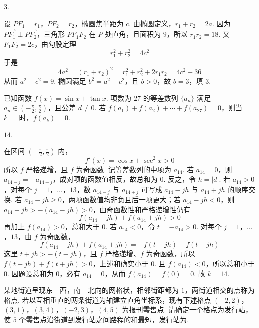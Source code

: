 \begin{answer}
\(3\).
\end{answer}

\begin{solution}
设 \(PF_1=r_1\)，\(PF_2=r_2\)，椭圆焦半距为 \(c\). 由椭圆定义，\(r_1+r_2=2a\). 因为 \(\overrightarrow{PF_1}\perp\overrightarrow{PF_2}\)，三角形 \(PF_1F_2\) 在 \(P\) 处直角，且面积为 \(9\)，所以 \(r_1r_2=18\). 又 \(F_1F_2=2c\)，由勾股定理
\[
r_1^2+r_2^2=4c^2
\]
于是
\[
4a^2=(r_1+r_2)^2=r_1^2+r_2^2+2r_1r_2=4c^2+36
\]
从而 \(a^2-c^2=9\). 椭圆满足 \(b^2=a^2-c^2\)，且 \(b>0\)，故 \(b=3\)，填 \(3\).
\end{solution}

\begin{problem}
已知函数 \(f(x) = \sin x + \tan x\). 项数为 \(27\) 的等差数列 \(\{a_n\}\) 满足 \(a_n \in \left( -\frac{\pi}{2}, \frac{\pi}{2} \right)\)，且公差 \(d \neq 0\). 若 \(f(a_1) + f(a_2) + \cdots + f(a_{27}) = 0\)，则当 \(k =\)\fillinblank{} 时，\(f(a_k) = 0\).
\end{problem}

\begin{answer}
\(14\).
\end{answer}

\begin{solution}
在区间 \(\left(-\frac\pi2,\frac\pi2\right)\) 内，
\[
f'(x)=\cos x+\sec^2x>0
\]
所以 \(f\) 严格递增，且 \(f\) 为奇函数. 记等差数列的中项为 \(a_{14}\). 若 \(a_{14}=0\)，则 \(a_{14-j}=-a_{14+j}\)，成对项的函数值相反，故总和为 \(0\). 反之，令 \(h=|d|\). 若 \(a_{14}>0\)，对每个 \(j=1\)，\(\ldots\)，\(13\)，数 \(a_{14-j}\) 与 \(a_{14+j}\) 可写成 \(a_{14}-jh\) 与 \(a_{14}+jh\) 的顺序交换. 若 \(a_{14}-jh\geqslant0\)，两项函数值均非负且后一项更大；若 \(a_{14}-jh<0\)，则 \(a_{14}+jh>-(a_{14}-jh)>0\)，由奇函数性和严格递增性仍有
\[
f(a_{14}-jh)+f(a_{14}+jh)>0
\]
再加上 \(f(a_{14})>0\)，总和大于 \(0\). 若 \(a_{14}<0\)，令 \(t=-a_{14}>0\). 对每个 \(j=1\)，\(\ldots\)，\(13\)，由 \(f\) 为奇函数，
\[
f(a_{14}-jh)+f(a_{14}+jh)
=-f(t+jh)-f(t-jh)
\]
这里 \(t+jh>-(t-jh)\)，且 \(f\) 严格递增、\(f\) 为奇函数，所以 \(f(t-jh)+f(t+jh)>0\)，上述和确实小于 \(0\).
且 \(f(a_{14})<0\)，所以总和小于 \(0\). 因题设总和为 \(0\)，必有 \(a_{14}=0\)，从而 \(f(a_{14})=f(0)=0\). 故 \(k=14\).
\end{solution}

\begin{problem}
某地街道呈现东—西，南—北向的网格状，相邻街距都为 \(1\)，两街道相交的点称为格点. 若以互相垂直的两条街道为轴建立直角坐标系，现有下述格点 \((-2, 2)\)，\((3, 1)\)，\((3, 4)\)，\((-2, 3)\)，\((4, 5)\) 为报刊零售点. 请确定一个格点为发行站，使 \(5\) 个零售点沿街道到发行站之间路程的和最短，发行站为\fillinblank{}.
\end{problem}


